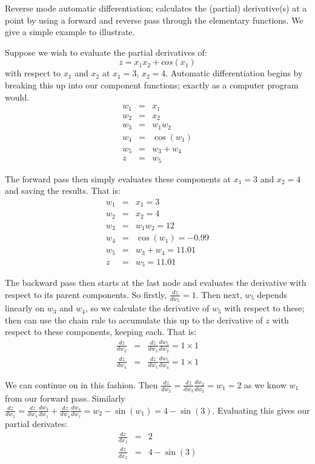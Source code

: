 Reverse mode automatic differentiation; calculates the (partial) derivative(s) at a point by using a forward and reverse pass through the elementary functions.
We give a simple example to illustrate.

Suppose we wish to evaluate the partial derivatives of:
\begin{equation}
	z = x_1 x_2 + cos(x_1)
\end{equation}
with respect to $x_1$ and $x_2$ at $x_1=3$, $x_2=4$.
Automatic differentiation begins by breaking this up into our component functions; exactly as a computer program would. 
\begin{eqnarray*}
	w_1 &=& x_1 \\
	w_2 &=& x_2 \\
	w_3 &=& w_1 w_2 \\
	w_4 &=& \cos\left(w_1\right) \\
	w_5 &=& w_3 + w_4 \\
	z &=& w_5
\end{eqnarray*}

The forward pass then simply evaluates these components at $x_1=3$ and $x_2=4$ and saving the results.
That is: 
\begin{eqnarray*}
	w_1 &=& x_1 = 3 \\
	w_2 &=& x_2 = 4\\
	w_3 &=& w_1 w_2 = 12 \\
	w_4 &=& \cos\left(w_1\right) = -0.99 \\
	w_5 &=& w_3 + w_4  = 11.01\\
	z &=& w_5 = 11.01
\end{eqnarray*}

The backward pass then starts at the last node and evaluates the derivative with respect to its parent components.
So firstly, $\frac{dz}{dw_5} = 1$.
Then next, $w_5$ depends linearly on $w_3$ and $w_4$, so we calculate the derivative of $w_5$ with respect to these; then can use the chain rule to accumulate this up to the derivative of $z$ with respect to these components, keeping each. 
That is:
\begin{eqnarray*}
	\frac{dz}{dw_3} &=& \frac{dz}{dw_5}\frac{dw_5}{dw_3} = 1 \times 1 \\
	\frac{dz}{dw_4} &=& \frac{dz}{dw_5}\frac{dw_5}{dw_4} = 1 \times 1
\end{eqnarray*}

We can continue on in this fashion.
Then $\frac{dz}{dw_2} = \frac{dz}{dw_3}\frac{dw_3}{dw_2} = w_1 = 2$ as we know $w_1$ from our forward pass.
Similarly $\frac{dz}{dw_1} = \frac{dz}{dw_3}\frac{dw_3}{dw_1} +  \frac{dz}{dw_4}\frac{dw_4}{dw_1}= w_2 - \sin(w_1)= 4 - \sin(3)$.
Evaluating this gives our partial derivates:
\begin{eqnarray*}
	\frac{dz}{dx_1} &=& 2 \\
	\frac{dz}{dx_2} &=& 4 - \sin(3)
\end{eqnarray*}

